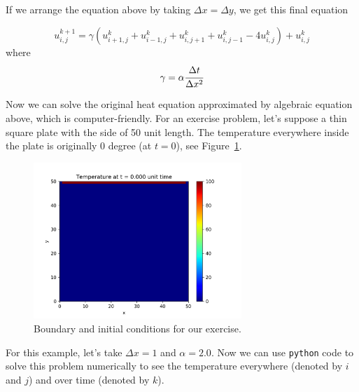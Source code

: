 If we arrange the equation above by taking $\Delta x = \Delta y$, we get this final equation

\begin{equation}
u_{i,j}^{k+1} = \gamma \left(u_{i+1,j}^{k}+u_{i-1,j}^{k}+u_{i,j+1}^{k}+u_{i,j-1}^{k}-4u_{i,j}^{k}\right)+u_{i,j}^{k}
\end{equation}
where
\begin{equation}
\gamma = \alpha\cfrac{\Delta t}{\Delta x^2}
\end{equation}

Now we can solve the original heat equation approximated by algebraic equation above, which is computer-friendly. For an exercise problem, let’s suppose a thin square plate with the side of 50 unit length. The temperature everywhere inside the plate is originally 0 degree (at $t = 0$), see Figure~\ref{fig:heat_start_1}.

\begin{figure}[htb]
	\centering
	\includegraphics[width=0.7\textwidth]{figures/frame0}
	\caption{Boundary and initial conditions for our exercise.}
	\label{fig:heat_start_1}
\end{figure} 

For this example, let’s take $\Delta x = 1$ and $\alpha = 2.0$. Now we can use \texttt{python} code to solve this problem numerically to see the temperature everywhere (denoted by $i$ and $j$) and over time (denoted by $k$). 

